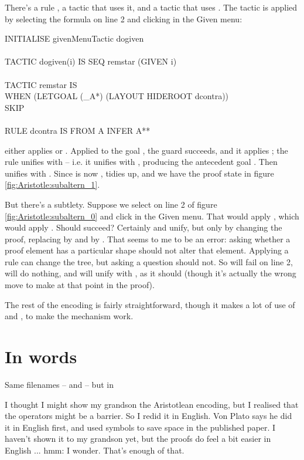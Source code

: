 There's a rule , a tactic  that uses it, and a tactic  that uses . The tactic  is applied by selecting the formula on line 2 and clicking  in the Given menu:
\begin{japeish}
INITIALISE givenMenuTactic dogiven\\
\\
TACTIC dogiven(i) IS SEQ remstar (GIVEN i) \\
\\
TACTIC remstar IS \\
\tab  WHEN (LETGOAL (\_A*) (LAYOUT HIDEROOT dcontra))\\
\tab\tab\tab\tab       SKIP\\
\\       
RULE dcontra IS FROM A INFER A**
\end{japeish}
 either applies  or . Applied to the goal , the  guard succeeds, and it applies ; the rule unifies  with  -- i.e. it unifies  with , producing the antecedent goal . Then  unifies  with . Since  is now ,  tidies up, and we have the proof state in figure \ref{fig:Aristotle:subaltern_1}.

But there's a subtlety. Suppose we select  on line 2 of figure \ref{fig:Aristotle:subaltern_0} and click  in the Given menu. That would apply , which would apply . Should  succeed? Certainly  and  unify, but only by changing the proof, replacing  by  and  by . That seems to me to be an error: asking whether a proof element has a particular shape should not alter that element. Applying a rule can change the tree, but asking a question should not. So  will fail on line 2,  will do nothing, and  will unify  with , as it should (though it's actually the wrong move to make at that point in the proof).

The rest of the encoding is fairly straightforward, though it makes a lot of use of  and , to make the  mechanism work.

\section{In words}

Same filenames --  and  -- but in 

I thought I might show my grandson the Aristotlean encoding, but I realised that the operators might be a barrier. So I redid it in English. Von Plato says he did it in English first, and used symbols to save space in the published paper. I haven't shown it to my grandson yet, but the proofs do feel a bit easier in English ... hmm: I wonder. That's enough of that.

